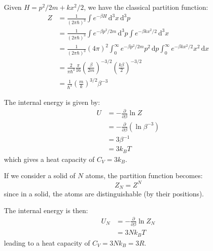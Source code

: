 \documentclass[12pt]{article}
\begin{document}



\pagebreak
\section*{}




Given $H = p^{2}/2m + kx^{2}/2$, we have the classical partition function:
\begin{equation}
    \begin{split}
        Z &= \frac{1}{(2\pi \hbar)^{3}} \int e^{-\beta H} \, \mathrm{d}^{3}x \, \mathrm{d}^{3}p \\
        &= \frac{1}{(2\pi \hbar)^{3}} \int e^{-\beta p^{2}/2m} \, \mathrm{d}^{3}p \int e^{-\beta kx^{2}/2} \, \mathrm{d}^{3}x \\
        &= \frac{1}{(2\pi \hbar)^{3}} (4\pi)^{2} \int_{0}^{\infty} e^{-\beta p^{2}/2m} p^{2} \, \mathrm{d}p \int_{0}^{\infty} e^{-\beta kx^{2}/2} x^{2} \, \mathrm{d}x \\
        &= \frac{2}{\pi \hbar^{3}} \frac{\pi}{16} \left( \frac{\beta}{2m} \right)^{-3/2} \left( \frac{k\beta}{2} \right)^{-3/2} \\
        &= \frac{1}{\hbar^{3}} \left( \frac{m}{k} \right)^{3/2} \beta^{-3}
    \end{split}
\end{equation}

The internal energy is given by:
\begin{equation}
    \begin{split}
        U &= -\frac{\partial}{\partial \beta} \ln Z \\
        &= -\frac{\partial}{\partial \beta} (\ln{\beta^{-3}}) \\
        &= 3\beta^{-1} \\
        &= 3k_{B}T
    \end{split}
\end{equation}
which gives a heat capacity of $C_{V} = 3k_{B}$.

If we consider a solid of $N$ atoms, the partition function becomes:
\begin{equation}
    Z_{N} = Z^{N}
\end{equation}
since in a solid, the atoms are distinguishable (by their positions).

The internal energy is then:
\begin{equation}
    \begin{split}
        U_{N} &= -\frac{\partial}{\partial \beta} \ln Z_{N} \\
        &= 3Nk_{B}T
    \end{split}
\end{equation}
leading to a heat capacity of $C_{V} = 3Nk_{B} = 3R$.
\end{document}
